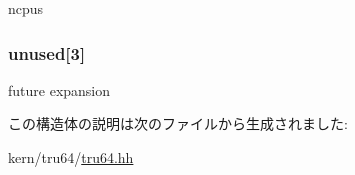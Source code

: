 ncpus \hypertarget{structTru64_1_1cpu__info_a636f5e28f6df8b80216977d9f5adb246}{
\subsubsection[{unused}]{ {\bf unused}\mbox{[}3\mbox{]}}}
\label{structTru64_1_1cpu__info_a636f5e28f6df8b80216977d9f5adb246}


future expansion 

この構造体の説明は次のファイルから生成されました:\begin{DoxyCompactItemize}
\item 
kern/tru64/\hyperlink{kern_2tru64_2tru64_8hh}{tru64.hh}\end{DoxyCompactItemize}
